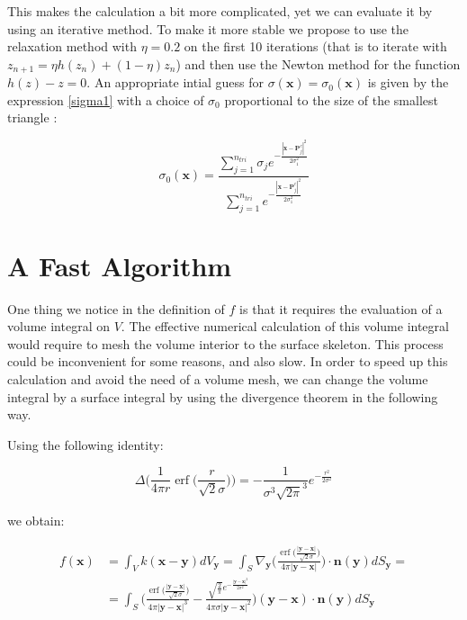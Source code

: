 \documentclass[11pt]{article}
\DeclareMathOperator\erf{erf}
\newcommand\bx{\boldsymbol x}
\newcommand\by{\boldsymbol y}
\newcommand\bn{\boldsymbol n}
\newcommand\bP{\boldsymbol P}
\begin{document}
This makes the calculation a bit more complicated, yet we can evaluate it by using an iterative method. To make it more stable we propose to use the relaxation method with $\eta=0.2$ on the first 10 iterations (that is to iterate with $z_{n+1}=\eta h(z_n)+(1-\eta)z_n$) and then use the Newton method for the function $h(z)-z=0$. An appropriate intial guess for $\sigma(\bx)=\sigma_0(\bx)$ is given by the expression \ref{sigma1} with a choice of $\sigma_0$ proportional to the size of the smallest triangle :
 
\begin{equation}\label{sigma0}
\sigma_0(\bx)=\frac{\sum_{j=1}^{n_{tri}}\sigma_je^{- \frac{|\bx-\bP_j^c|^2}{2\sigma^2_1}}}{\sum_{j=1}^{n_{tri}}e^{-\frac{|\bx-\bP_j^c|^2}{2\sigma^2_1}}}
\end{equation}







\section{A Fast Algorithm}


One thing we notice in the definition of $f$ is that it requires the evaluation of a volume integral on $\mathit{V}$. The effective numerical calculation of this volume integral would require to mesh the volume interior to the surface skeleton. This process could be inconvenient for some reasons, and also slow.  In order to speed up this calculation and avoid the need of a volume mesh, we can change the volume integral by a surface integral by using the divergence theorem in the following way.

Using the following identity:

\begin{equation}
\Delta\Big(\frac{1}{4\pi r}\erf\Big(\frac{r}{\sqrt{2}\sigma}\Big)\Big)=-\frac{1}{\sigma^3\sqrt{2\pi}^3}e^{-\frac{r^2}{2\sigma^2}}
\end{equation}
 
 we obtain:
 
\begin{equation}\label{surf_f}
\begin{aligned}
f(\bx)&=\int_{V}k(\bx-\by)dV_{\by}=\int_{\mathit{S}}\nabla_{\by}\Big(\frac{\erf\big(\frac{|\by-\bx|}{\sqrt{2}\sigma}\big)}{4\pi|\by-\bx|}\Big)\cdot\bn(\by)dS_{\by}=\\
&=\int_{\mathit{S}}\Bigg(\frac{\erf\big(\frac{|\by-\bx|}{\sqrt{2}\sigma}\big)}{4\pi|\by-\bx|^3}-\frac{\sqrt{\frac{2}{\pi}}e^{-\frac{|\by-\bx|^2}{2\sigma^2}}}{4\pi\sigma|\by-\bx|^2}\Bigg)(\by-\bx)\cdot\bn(\by)dS_{\by}
\end{aligned}
\end{equation}
\end{document}
